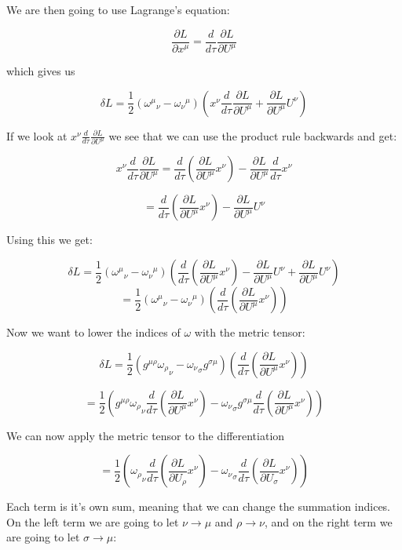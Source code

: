 \documentclass[a4paper,norsk, 10pt]{article}
\begin{document}
We are then going to use Lagrange's equation:

$$
\frac{\partial L}{\partial x^{\mu}} = \frac{d}{d\tau}\frac{\partial L}{\partial U^{\mu}}
$$

which gives us

$$
\delta L = \frac{1}{2}({\omega^{\mu}}_{\nu} - {\omega_{\nu}}^{\mu})\left(x^{\nu}\frac{d}{d\tau}\frac{\partial L}{\partial U^{\mu}} + \frac{\partial L}{\partial U^{\mu}}U^{\nu}\right)
$$

If we look at $x^{\nu}\frac{d}{d\tau}\frac{\partial L}{\partial U^{\mu}}$ we see that we can use the product rule backwards and get:

$$
x^{\nu}\frac{d}{d\tau}\frac{\partial L}{\partial U^{\mu}} = \frac{d}{d\tau}\left(\frac{\partial L}{\partial U^{\mu}}x^{\nu}\right) - \frac{\partial L}{\partial U^{\mu}}\frac{d}{d\tau}x^{\nu}
$$

$$
= \frac{d}{d\tau}\left(\frac{\partial L}{\partial U^{\mu}}x^{\nu}\right) - \frac{\partial L}{\partial U^{\mu}}U^{\nu}
$$

Using this we get:

$$
\delta L = \frac{1}{2}({\omega^{\mu}}_{\nu} - {\omega_{\nu}}^{\mu})\left(\frac{d}{d\tau}\left(\frac{\partial L}{\partial U^{\mu}}x^{\nu}\right) - \frac{\partial L}{\partial U^{\mu}}U^{\nu} + \frac{\partial L}{\partial U^{\mu}}U^{\nu}\right)
$$
$$
=\frac{1}{2}({\omega^{\mu}}_{\nu} - {\omega_{\nu}}^{\mu})\left(\frac{d}{d\tau}\left(\frac{\partial L}{\partial U^{\mu}}x^{\nu}\right) \right)
$$


Now we want to lower the indices of $\omega$ with the metric tensor:

$$
\delta L = \frac{1}{2}(g^{\mu \rho}{\omega_{\rho}}_{\nu} - {\omega_{\nu}}_{\sigma}g^{\sigma\mu})\left(\frac{d}{d\tau}\left(\frac{\partial L}{\partial U^{\mu}}x^{\nu}\right) \right)
$$

$$
= \frac{1}{2}\left( g^{\mu \rho}{\omega_{\rho}}_{\nu}\frac{d}{d\tau}\left(\frac{\partial L}{\partial U^{\mu}}x^{\nu}\right) - {\omega_{\nu}}_{\sigma}g^{\sigma\mu}\frac{d}{d\tau}\left(\frac{\partial L}{\partial U^{\mu}}x^{\nu}\right)\right)
$$

We can now apply the metric tensor to the differentiation

$$
= \frac{1}{2}\left({\omega_{\rho}}_{\nu}\frac{d}{d\tau}\left(\frac{\partial L}{\partial U_{\rho}}x^{\nu}\right) - {\omega_{\nu}}_{\sigma}\frac{d}{d\tau}\left(\frac{\partial L}{\partial U_{\sigma}}x^{\nu}\right)\right)
$$


Each term is it's own sum, meaning that we can change the summation indices. On the left term we are going to let $\nu \rightarrow \mu$ and $\rho \rightarrow \nu$, and on the right term we are going to let $\sigma \rightarrow \mu$:
\end{document}
